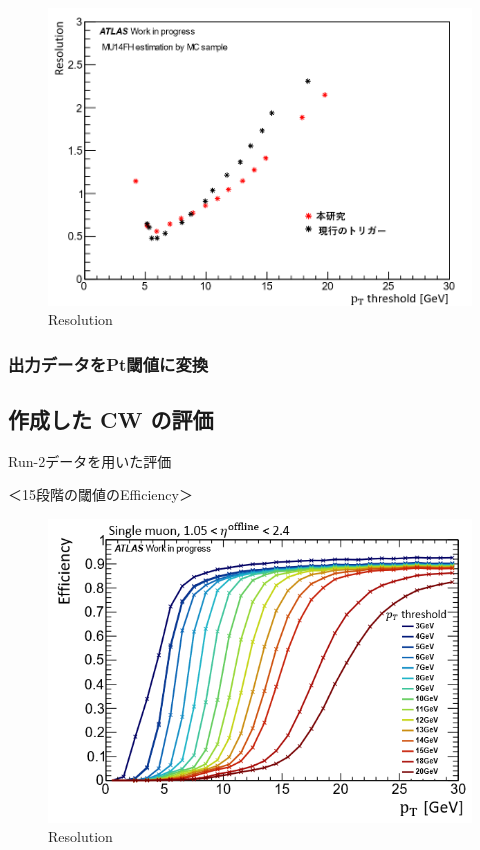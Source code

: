 \begin{figure}[tb]
  \centering
  \includegraphics[clip, width=14cm]{fig/4/resolution_v07_v05.png}
  \caption{Resolution}
  \label{fig:Resolution}
\end{figure}

\subsubsection{出力データをPt閾値に変換}

\subsection{作成した CW の評価}
Run-2データを用いた評価

＜15段階の閾値のEfficiency＞
\begin{figure}[tb]
  \centering
  \includegraphics[clip, width=14cm]{fig/4/v07_15_Eff.png}
  \caption{Resolution}
  \label{fig:Resolution}
\end{figure}


